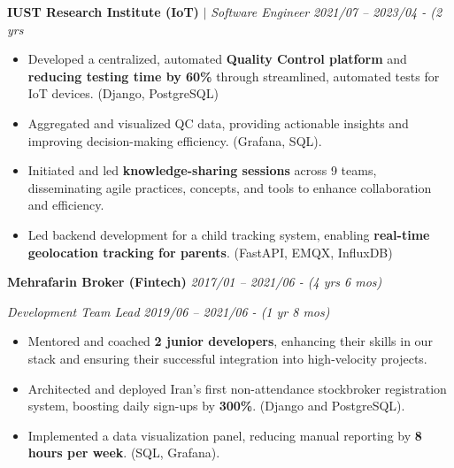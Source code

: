 \documentclass[11 pt,a4paper]{article} %
\newcommand{\companynamesize}{\large}         %
\newcommand{\jobtitlesize}{\normalsize}       %
\newcommand{\datesize}{\small}                %
\newcommand{\techstacksize}{\small}           %
\newlength{\itemgap}
\newlength{\jobgap}
\newcommand{\techstack}[1]{\textcolor{techcolor}{\techstacksize #1}}
\begin{document}
\vspace{\jobgap}

{\companynamesize \textbf{\textcolor{companycolor}{IUST Research Institute (IoT)}}} $|$ {\jobtitlesize \textit{\textcolor{positioncolor}{Software Engineer}}} \hfill {\datesize \textit{\textcolor{companycolor}{2021/07 -- 2023/04 - (2 yrs}}} %
\begin{itemize}[leftmargin=0.2in, itemsep=\itemgap, topsep=2pt]
    \item Developed a centralized, automated \textbf{Quality Control platform} and \textbf{reducing testing time by 60\%} through streamlined, automated tests for IoT devices. \techstack{(Django, PostgreSQL)} %
    \item Aggregated and visualized QC data, providing actionable insights and improving decision-making efficiency. \techstack{(Grafana, SQL)}. %
    \item Initiated and led \textbf{knowledge-sharing sessions} across 9 teams, disseminating agile practices, concepts, and tools to enhance collaboration and efficiency. %
    \item Led backend development for a child tracking system, enabling \textbf{real-time geolocation tracking for parents}. \techstack{(FastAPI, EMQX, InfluxDB)} %
\end{itemize}

\vspace{\jobgap}

{\companynamesize \textbf{\textcolor{companycolor}{Mehrafarin Broker (Fintech)}}} \hfill {\datesize \textit{\textcolor{companycolor}{2017/01 -- 2021/06 - (4 yrs 6 mos)}}} %

\vspace{0.3em} %

{\jobtitlesize \textit{\textcolor{positioncolor}{Development Team Lead}}} \hfill {\datesize \textit{\textcolor{companycolor}{2019/06 -- 2021/06 - (1 yr 8 mos)}}} %
\begin{itemize}[leftmargin=0.2in, itemsep=\itemgap, topsep=2pt]
    \item Mentored and coached \textbf{2 junior developers}, enhancing their skills in our stack and ensuring their successful integration into high-velocity projects. %
    \item Architected and deployed Iran's first non-attendance stockbroker registration system, boosting daily sign-ups by \textbf{300\%}. \techstack{(Django and PostgreSQL)}. %
    \item Implemented a data visualization panel, reducing manual reporting by \textbf{8 hours per week}. \techstack{(SQL, Grafana)}. %
\end{itemize}
\end{document}
